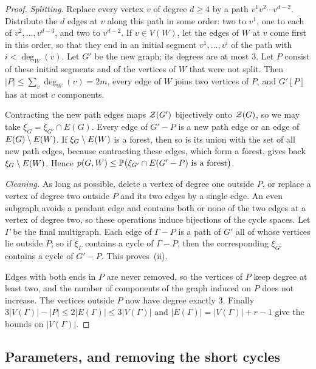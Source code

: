 \begin{proof}
\emph{Splitting.} Replace every vertex $v$ of degree $d\ge4$ by a path $v^{1}v^{2}\cdots v^{d-2}$.
Distribute the $d$ edges at $v$ along this path in some order: two to $v^{1}$, one to each of
$v^{2},\dots,v^{d-3}$, and two to $v^{d-2}$. If $v\in V(W)$, let the edges of $W$ at $v$ come first
in this order, so that they end in an initial segment $v^{1},\dots,v^{i}$ of the path with
$i<\deg_W(v)$. Let $G'$ be the new graph; its degrees are at most $3$. Let $P$ consist of these
initial segments and of the vertices of $W$ that were not split. Then $|P|\le\sum_v\deg_W(v)=2m$,
every edge of $W$ joins two vertices of $P$, and $G'[P]$ has at most $c$ components.

Contracting the new path edges maps $\mathcal{Z}(G')$ bijectively onto $\mathcal{Z}(G)$, so we may take
$\xi_G=\xi_{G'}\cap E(G)$. Every edge of $G'-P$ is a new path edge or an edge of $E(G)\setminus E(W)$. If
$\xi_G\setminus E(W)$ is a forest, then so is its union with the set of all new path edges, because
contracting these edges, which form a forest, gives back $\xi_G\setminus E(W)$. Hence
$p(G,W)\le\mathbb{P}\bigl(\xi_{G'}\cap E(G'-P)\text{ is a forest}\bigr)$.

\emph{Cleaning.} As long as possible, delete a vertex of degree one outside $P$, or replace a vertex
of degree two outside $P$ and its two edges by a single edge. An even subgraph avoids a pendant edge
and contains both or none of the two edges at a vertex of degree two, so these operations induce
bijections of the cycle spaces. Let $\Gamma$ be the final multigraph. Each edge of $\Gamma-P$ is a
path of $G'$ all of whose vertices lie outside $P$; so if $\xi_\Gamma$ contains a cycle of
$\Gamma-P$, then the corresponding $\xi_{G'}$ contains a cycle of $G'-P$. This proves~(ii).

Edges with both ends in $P$ are never removed, so the vertices of $P$ keep degree at least two, and
the number of components of the graph induced on $P$ does not increase. The vertices outside $P$ now
have degree exactly $3$. Finally $3|V(\Gamma)|-|P|\le2|E(\Gamma)|\le3|V(\Gamma)|$ and
$|E(\Gamma)|=|V(\Gamma)|+r-1$ give the bounds on $|V(\Gamma)|$.
\end{proof}

\subsection{Parameters, and removing the short cycles}

